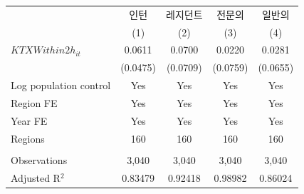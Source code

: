 \begingroup
\centering
\begin{tabular}{lcccc}
   \toprule
                          & 인턴     & 레지던트 & 전문의   & 일반의 \\   
                          & (1)      & (2)      & (3)      & (4)\\  
   \midrule 
   $KTXWithin2h_{it}$     & 0.0611   & 0.0700   & 0.0220   & 0.0281\\   
                          & (0.0475) & (0.0709) & (0.0759) & (0.0655)\\   
   Log population control & Yes      & Yes      & Yes      & Yes\\  
   Region FE              & Yes      & Yes      & Yes      & Yes\\  
   Year FE                & Yes      & Yes      & Yes      & Yes\\  
   Regions                & 160      & 160      & 160      & 160\\  
    \\
   Observations           & 3,040    & 3,040    & 3,040    & 3,040\\  
   Adjusted R$^2$         & 0.83479  & 0.92418  & 0.98982  & 0.86024\\  
   \bottomrule
\end{tabular}
\par\endgroup
